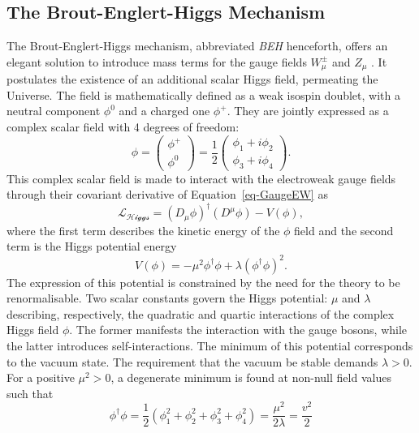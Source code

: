 \subsection{The Brout-Englert-Higgs Mechanism}
The Brout-Englert-Higgs mechanism, abbreviated \textit{BEH} henceforth, offers an elegant solution to introduce mass terms for the gauge fields $W_{\mu}^{\pm}$ and $Z_{\mu}$ \cite{Englert:1964et,  PhysRevLett.13.508}. It postulates the existence of an additional scalar Higgs field, permeating the Universe. The field is mathematically defined as a weak isospin doublet, with a neutral component $\phi^0$ and a charged one $\phi^+$. They are jointly expressed as a complex scalar field with 4 degrees of freedom:
\begin{equation}
\phi = \begin{pmatrix}
    \phi^+\\ 
    \phi^0
\end{pmatrix} = \frac{1}{2} \begin{pmatrix}
    \phi_1 + i\phi_2 \\ 
    \phi_3 + i\phi_4
\end{pmatrix}.
\end{equation}
This complex scalar field is made to interact with the electroweak gauge fields through their covariant derivative of Equation~\ref{eq-GaugeEW} as 
\begin{equation}\label{eq-HiggsLag}
    \mathcal{L_{\text{Higgs}}} = (D_{\mu}\phi)^{\dagger} (D^{\mu}\phi) - V(\phi),
 \end{equation}
where the first term describes the kinetic energy of the $\phi$ field and the second term is the Higgs potential energy
\begin{equation}\label{eq-HiggsPot}
 V(\phi) = - \mu^2  \phi^{\dagger} \phi + \lambda (\phi^{\dagger} \phi)^2.
\end{equation}
The expression of this potential is constrained by the need for the theory to be renormalisable. Two scalar constants govern the Higgs potential: $\mu$ and $\lambda$ describing, respectively, the quadratic and quartic interactions of the complex Higgs field $\phi$. The former manifests the interaction with the gauge bosons, while the latter introduces self-interactions. The minimum of this potential corresponds to the vacuum state. The requirement that the vacuum be stable demands $\lambda > 0$. For a positive $\mu^2 > 0$, a degenerate minimum is found at non-null field values such that
\begin{equation}\label{eq-HiggsVacEq}
    \phi^{\dagger} \phi  = \frac{1}{2} (\phi_1^2 + \phi_2^2 + \phi_3^2 + \phi_4^2) = \frac{\mu^2}{2\lambda} = \frac{v^2}{2}
\end{equation}
